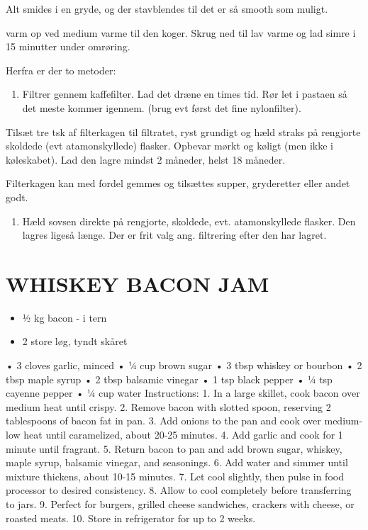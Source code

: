 \documentclass[
]{book}
\providecommand{\tightlist}{%
  \setlength{\itemsep}{0pt}\setlength{\parskip}{0pt}}
\begin{document}
Alt smides i en gryde, og der stavblendes til det er så smooth som muligt.

varm op ved medium varme til den koger. Skrug ned til lav varme og lad simre
i 15 minutter under omrøring.

Herfra er der to metoder:

\begin{enumerate}
\def\labelenumi{\arabic{enumi}.}
\tightlist
\item
  Filtrer gennem kaffefilter. Lad det dræne en times tid. Rør let i pastaen
  så det meste kommer igennem. (brug evt først det fine nylonfilter).
\end{enumerate}

Tilsæt tre tsk af filterkagen til filtratet, ryst grundigt og hæld straks på
rengjorte skoldede (evt atamonskyllede) flasker. Opbevar mørkt og køligt
(men ikke i køleskabet). Lad den lagre mindst 2 måneder, helst 18 måneder.

Filterkagen kan med fordel gemmes og tilsættes supper, gryderetter eller andet godt.

\begin{enumerate}
\def\labelenumi{\arabic{enumi}.}
\setcounter{enumi}{1}
\tightlist
\item
  Hæld sovsen direkte på rengjorte, skoldede, evt. atamonskyllede flasker.
  Den lagres ligeså længe. Der er frit valg ang. filtrering efter den har lagret.
\end{enumerate}

\hypertarget{whiskey-bacon-jam}{%
\section{WHISKEY BACON JAM}\label{whiskey-bacon-jam}}

\begin{itemize}
\tightlist
\item
  ½ kg bacon - i tern
\item
  2 store løg, tyndt skåret
\end{itemize}

• 3 cloves garlic, minced
• ¼ cup brown sugar
• 3 tbsp whiskey or bourbon
• 2 tbsp maple syrup
• 2 tbsp balsamic vinegar
• 1 tsp black pepper
• ¼ tsp cayenne pepper
• ¼ cup water
Instructions:
1. In a large skillet, cook bacon over medium heat until crispy.
2. Remove bacon with slotted spoon, reserving 2 tablespoons of bacon fat in pan.
3. Add onions to the pan and cook over medium-low heat until caramelized, about 20-25 minutes.
4. Add garlic and cook for 1 minute until fragrant.
5. Return bacon to pan and add brown sugar, whiskey, maple syrup, balsamic vinegar, and seasonings.
6. Add water and simmer until mixture thickens, about 10-15 minutes.
7. Let cool slightly, then pulse in food processor to desired consistency.
8. Allow to cool completely before transferring to jars.
9. Perfect for burgers, grilled cheese sandwiches, crackers with cheese, or roasted meats.
10. Store in refrigerator for up to 2 weeks.
\end{document}
